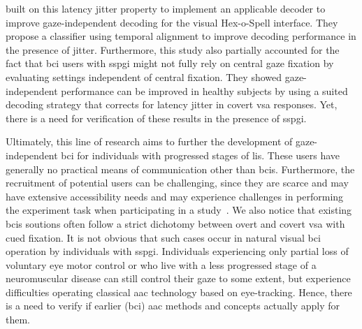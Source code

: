 \documentclass{article}
\begin{document}
\textcite{VanDenKerchove2024} built on this latency jitter property
to implement an applicable decoder to improve
gaze-independent decoding for the visual Hex-o-Spell interface.
They propose a classifier using temporal alignment to improve decoding
performance in the presence of jitter.
Furthermore, this study also partially accounted for the fact that \ac{bci}
users with \ac{sspgi} might not fully rely on central gaze fixation by
evaluating settings independent of central fixation.
They showed gaze-independent performance can be improved in healthy subjects by
using a suited decoding strategy that corrects for latency jitter in covert \ac{vsa} responses.
Yet, there is a need for verification of these results in the presence of \ac{sspgi}.

Ultimately, this line of research aims to further the development of
gaze-independent \ac{bci} for individuals with progressed stages of \ac{lis}.
These users have generally no practical means of communication other than
\acp{bci}.
Furthermore, the recruitment of potential users can be challenging,
since they are scarce and may have extensive accessibility needs and
may experience challenges in performing the experiment task when
participating in a study~\cite{Wolpaw2006}.
We also notice that existing \acp{bci} soutions often follow a strict dichotomy
between overt and covert \ac{vsa} with cued fixation.
It is not obvious that such cases occur in natural visual \ac{bci} operation by
individuals with \ac{sspgi}.
Individuals experiencing only partial loss of voluntary eye
motor control or who live with a less progressed stage of a neuromuscular
disease can still control their gaze to some extent, but experience
difficulties operating classical \ac{aac} technology based on eye-tracking.
Hence, there is a need to verify if earlier (\ac{bci}) \ac{aac} methods and
concepts actually apply for them.
\end{document}

